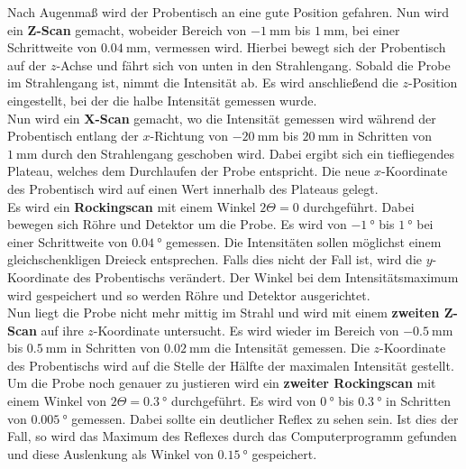         \noindent Nach Augenmaß wird der Probentisch an eine gute Position gefahren. Nun wird ein \textbf{Z-Scan} gemacht, wobeider Bereich von 
        $\SI{-1}{\milli\metre}$ bis $\SI{1}{\milli\metre}$, bei einer Schrittweite von $\SI{0.04}{\milli\metre}$, vermessen wird. Hierbei bewegt sich der Probentisch auf der $z$-Achse und fährt 
        sich von unten in den Strahlengang. Sobald die Probe im Strahlengang ist, nimmt die Intensität ab. Es wird anschließend die $z$-Position 
        eingestellt, bei der die halbe Intensität gemessen wurde. \\ 

        \noindent Nun wird ein \textbf{X-Scan} gemacht, wo die Intensität gemessen wird während der Probentisch entlang der $x$-Richtung von 
        $\SI{-20}{\milli\metre}$ bis $\SI{20}{\milli\metre}$ in Schritten von $\SI{1}{\milli\metre}$ durch den Strahlengang geschoben wird. Dabei ergibt sich ein tiefliegendes Plateau, 
        welches dem Durchlaufen der Probe entspricht. Die neue $x$-Koordinate des Probentisch wird auf einen Wert innerhalb des Plateaus gelegt. \\

        \noindent Es wird ein \textbf{Rockingscan} mit einem Winkel $2 \Theta = \num{0}$ durchgeführt. Dabei bewegen sich Röhre und Detektor um die Probe. 
        Es wird von $\SI{-1}{\degree}$ bis $\SI{1}{\degree}$ bei einer Schrittweite von $\SI{0.04}{\degree}$ gemessen. Die Intensitäten sollen
        möglichst einem gleichschenkligen Dreieck entsprechen. Falls dies nicht der Fall ist, wird die $y$-Koordinate des Probentischs verändert. 
        Der Winkel bei dem Intensitätsmaximum wird gespeichert und so werden Röhre und Detektor ausgerichtet. \\

        \noindent Nun liegt die Probe nicht mehr mittig im Strahl und wird mit einem \textbf{zweiten Z-Scan} auf ihre $z$-Koordinate untersucht. 
        Es wird wieder im Bereich von $\SI{-0.5}{\milli\metre}$ bis $\SI{0.5}{\milli\metre}$ in Schritten von $\SI{0.02}{\milli\metre}$ die Intensität gemessen. Die $z$-Koordinate des 
        Probentischs wird auf die Stelle der Hälfte der maximalen Intensität gestellt. \\

        \noindent Um die Probe noch genauer zu justieren wird ein \textbf{zweiter Rockingscan} mit einem Winkel von $2\Theta = \SI{0.3}{\degree}$ 
        durchgeführt. Es wird von $\SI{0}{\degree}$ bis $\SI{0.3}{\degree}$ in Schritten von $\SI{0.005}{\degree}$ gemessen.
        Dabei sollte ein deutlicher Reflex zu sehen sein. 
        Ist dies der Fall, so wird das Maximum des Reflexes durch das Computerprogramm gefunden und diese Auslenkung als Winkel von 
        $\SI{0.15}{\degree}$ gespeichert. \\

